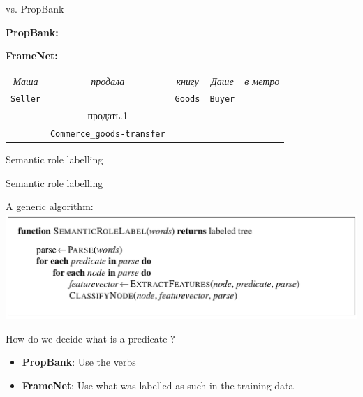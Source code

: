 \documentclass[10pt, compress]{beamer}
\begin{document}
\begin{frame}{vs. PropBank}

\textbf{PropBank:}

\begin{center}
\end{center}

\textbf{FrameNet:}
\begin{center}
\begin{tabular}{ccccc}
\emph{ Маша }&\emph{ продала }&\emph{ книгу }&\emph{ Даше }&\emph{ в метро} \\
\texttt{Seller} &      ~    & \texttt{Goods}  & \texttt{Buyer} & \\
~              & продать.1 & ~                 & ~  & ~ \\
~              &     \texttt{Commerce\_goods-transfer}    & ~ & ~ & \\
\end{tabular}
\end{center}

\end{frame}


\begin{frame}[standout]
 Semantic role labelling
\end{frame}

\begin{frame}{Semantic role labelling}

A generic algorithm:
\includegraphics[width=\textwidth]{graphics/srl-parsing-algo.png}

How do we decide what is a predicate ?
\begin{itemize}
  \item \textbf{PropBank}: Use the verbs 
  \item \textbf{FrameNet}: Use what was labelled as such in the training data
\end{itemize}

\end{frame}
\end{document}
